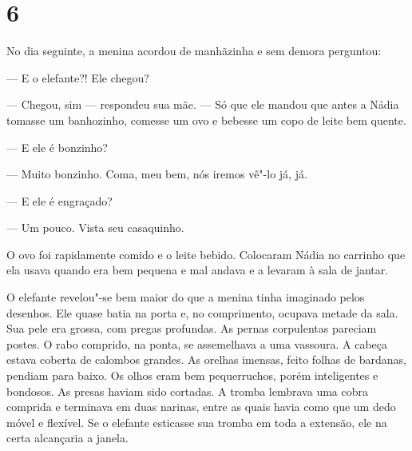 \section{6}

No dia seguinte, a menina acordou de manhãzinha e sem demora perguntou:

--- E o elefante?! Ele chegou?

--- Chegou, sim --- respondeu sua mãe. --- Só que ele mandou que antes a
Nádia tomasse um banhozinho, comesse um ovo e bebesse um copo de leite
bem quente.

--- E ele é bonzinho?

--- Muito bonzinho. Coma, meu bem, nós iremos vê"-lo já, já.

--- E ele é engraçado?

--- Um pouco. Vista seu casaquinho.

O ovo foi rapidamente comido e o leite bebido. Colocaram Nádia no
carrinho que ela usava quando era bem pequena e mal andava e a levaram à
sala de jantar.

O elefante revelou"-se bem maior do que a menina tinha imaginado pelos desenhos. Ele quase batia na porta e, no comprimento,
ocupava metade da sala. Sua pele era grossa, com pregas profundas. As
pernas corpulentas pareciam postes. O rabo comprido, na ponta, se
assemelhava a uma vassoura. A cabeça estava coberta de calombos
grandes. As orelhas imensas, feito folhas de bardanas, pendiam para
baixo. Os olhos eram bem pequerruchos, porém inteligentes e bondosos. As
presas haviam sido cortadas. A tromba lembrava uma cobra comprida e
terminava em duas narinas, entre as quais havia como que um dedo móvel e
flexível. Se o elefante esticasse sua tromba em toda a extensão, ele na
certa alcançaria a janela.

